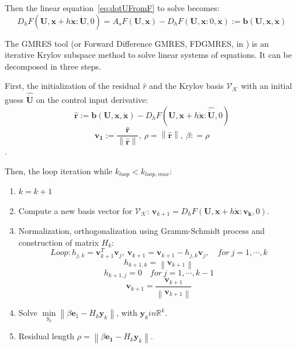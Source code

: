 \documentclass[a4paper, 12pt]{report}
\newcommand\norm[1]{\left\lVert#1\right\rVert}
\begin{document}
Then the linear equation~\ref{eq:dotUFromF} to solve becomes:
\[ D_h F(\boldsymbol{U}, \boldsymbol{x}+ h\boldsymbol{\dot x} : \boldsymbol{\dot U}, 0) = A_s F(\boldsymbol{U}, \boldsymbol{x}) - D_h F(\boldsymbol{U}, \boldsymbol{x} : 0, \boldsymbol{\dot x}) := \boldsymbol{b}(\boldsymbol{U}, \boldsymbol{x}, \boldsymbol{\dot x}) \]

The GMRES tool (or Forward Difference GMRES, FDGMRES, in \cite{Kelley1995}) is an iterative Krylov subspace method to solve linear systems of equations. It can be decomposed in three steps.

First, the initialization of the residual $\hat r$ and the Krylov basis $\mathcal{V}_\mathcal{K}$ with an initial guess $\boldsymbol{\hat{ \dot U}}$ on the control input derivative:
\[ \boldsymbol{\hat r} := \boldsymbol{b}(\boldsymbol{U}, \boldsymbol{x}, \boldsymbol{\dot x}) - D_h F(\boldsymbol{U}, \boldsymbol{x}+ h\boldsymbol{\dot x} : \boldsymbol{\hat{\dot U}}, 0) \]
\[\boldsymbol{v_1} := \frac{\boldsymbol{\hat r}}{\norm{\boldsymbol{\hat r}}},\ \rho = \norm{\boldsymbol{\hat r}},\ \beta: = \rho \].

Then, the loop iteration while $k_{loop} < k_{loop,max}$:
\begin{enumerate}
\item $k = k+1$
\item Compute a new basis vector for $\mathcal{V}_\mathcal{K}$: $\boldsymbol{v}_{k+1} =  D_h F(\boldsymbol{U}, \boldsymbol{x}+ h\boldsymbol{\dot x} : \boldsymbol{v_k}, 0)$.
\item Normalization, orthogonalization using Gramm-Schmidt process and construction of matrix $H_k$:
\[ Loop: h_{j,k} = \boldsymbol{v}_{k+1}^T \boldsymbol{v}_j,\ \boldsymbol{v}_{k+1} = \boldsymbol{v}_{k+1} - h_{j,k}\boldsymbol{v}_j, \quad for\ j = 1, \cdots, k \]
\[ h_{k+1,k} = \norm{\boldsymbol{v}_{k+1}} \]
\[ h_{k+1, j} =  0\quad for\ j = 1, \cdots, k-1 \]
\[ \boldsymbol{v}_{k+1} = \frac{\boldsymbol{v}_{k+1}}{\norm{\boldsymbol{v}_{k+1}}} \]
\item Solve $\min\limits_{y_k}\norm{\beta \boldsymbol{e}_1 - H_k\boldsymbol{y}_k}$, with $\boldsymbol{y}_k in \mathbb{R}^k$.
\item Residual length $\rho = \norm{\beta \boldsymbol{e_1} - H_k\boldsymbol{y}_k}$.
\end{enumerate}
\end{document}
